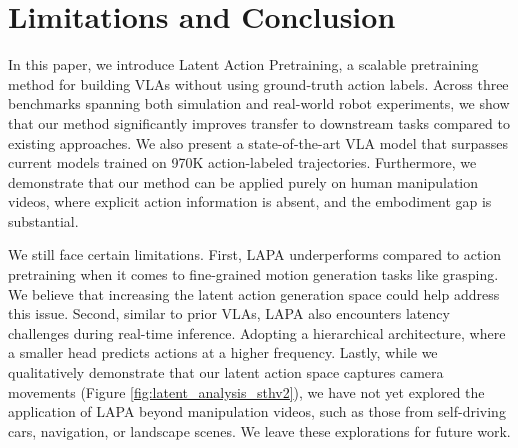 \documentclass{article} %
\begin{document}
\section{Limitations and Conclusion}
In this paper, we introduce Latent Action Pretraining, a scalable pretraining method for building VLAs {without using ground-truth action labels}. Across three benchmarks spanning both simulation and real-world robot experiments, we show that our method significantly improves transfer to downstream tasks compared to existing approaches. We also present a state-of-the-art VLA model that surpasses current models trained on 970K action-labeled trajectories. Furthermore, we demonstrate that our method can be applied purely on human manipulation videos, where explicit action information is absent, and the embodiment gap is substantial. 

We still face certain limitations. First, LAPA underperforms compared to action pretraining when it comes to fine-grained motion generation tasks like grasping. We believe that increasing the latent action generation space could help address this issue. Second, similar to prior VLAs, LAPA also encounters latency challenges during real-time inference. Adopting a hierarchical architecture, where a smaller head predicts actions at a higher frequency. Lastly, while we qualitatively demonstrate that our latent action space captures camera movements (Figure \ref{fig:latent_analysis_sthv2}), we have not yet explored the application of LAPA beyond manipulation videos, such as those from self-driving cars, navigation, or landscape scenes. We leave these explorations for future work.
\end{document}
